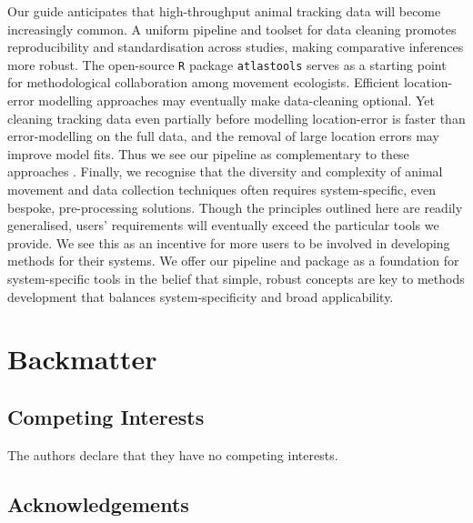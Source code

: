 \documentclass[10pt,paper=a4,headings=standardclasses
]{scrartcl}
\begin{document}
Our guide anticipates that high-throughput animal tracking data will become increasingly common.
A uniform pipeline and toolset for data cleaning promotes reproducibility and standardisation across studies, making comparative inferences more robust.
The open-source \texttt{R} package \texttt{atlastools} serves as a starting point for methodological collaboration among movement ecologists.
Efficient location-error modelling approaches \citep{fleming2020, aspillaga2021} may eventually make data-cleaning optional.
Yet cleaning tracking data even partially before modelling location-error is faster than error-modelling on the full data, and the removal of large location errors may improve model fits.
Thus we see our pipeline as complementary to these approaches \citep{fleming2014a, fleming2020}.
Finally, we recognise that the diversity and complexity of animal movement and data collection techniques often requires system-specific, even bespoke, pre-processing solutions.
Though the principles outlined here are readily generalised, users' requirements will eventually exceed the particular tools we provide.
We see this as an incentive for more users to be involved in developing methods for their systems.
We offer our pipeline and package as a foundation for system-specific tools in the belief that simple, robust concepts are key to methods development that balances system-specificity and broad applicability.

\section{Backmatter}

\subsection{Competing Interests}

The authors declare that they have no competing interests.

\subsection{Acknowledgements}
\end{document}
